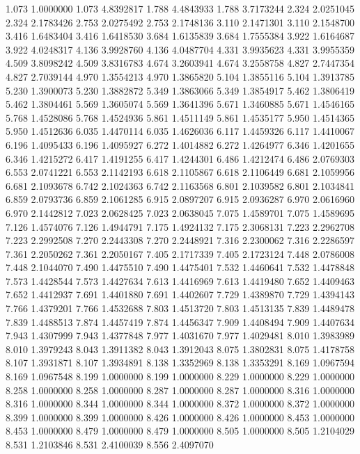 1.073 1.0000000
1.073 4.8392817
1.788 4.4843933
1.788 3.7173244
2.324 2.0251045
2.324 2.1783426
2.753 2.0275492
2.753 2.1748136
3.110 2.1471301
3.110 2.1548700
3.416 1.6483404
3.416 1.6418530
3.684 1.6135839
3.684 1.7555384
3.922 1.6164687
3.922 4.0248317
4.136 3.9928760
4.136 4.0487704
4.331 3.9935623
4.331 3.9955359
4.509 3.8098242
4.509 3.8316783
4.674 3.2603941
4.674 3.2558758
4.827 2.7447354
4.827 2.7039144
4.970 1.3554213
4.970 1.3865820
5.104 1.3855116
5.104 1.3913785
5.230 1.3900073
5.230 1.3882872
5.349 1.3863066
5.349 1.3854917
5.462 1.3806419
5.462 1.3804461
5.569 1.3605074
5.569 1.3641396
5.671 1.3460885
5.671 1.4546165
5.768 1.4528086
5.768 1.4524936
5.861 1.4511149
5.861 1.4535177
5.950 1.4514365
5.950 1.4512636
6.035 1.4470114
6.035 1.4626036
6.117 1.4459326
6.117 1.4410067
6.196 1.4095433
6.196 1.4095927
6.272 1.4014882
6.272 1.4264977
6.346 1.4201655
6.346 1.4215272
6.417 1.4191255
6.417 1.4244301
6.486 1.4212474
6.486 2.0769303
6.553 2.0741221
6.553 2.1142193
6.618 2.1105867
6.618 2.1106449
6.681 2.1059956
6.681 2.1093678
6.742 2.1024363
6.742 2.1163568
6.801 2.1039582
6.801 2.1034841
6.859 2.0793736
6.859 2.1061285
6.915 2.0897207
6.915 2.0936287
6.970 2.0616960
6.970 2.1442812
7.023 2.0628425
7.023 2.0638045
7.075 1.4589701
7.075 1.4589695
7.126 1.4574076
7.126 1.4944791
7.175 1.4924132
7.175 2.3068131
7.223 2.2962708
7.223 2.2992508
7.270 2.2443308
7.270 2.2448921
7.316 2.2300062
7.316 2.2286597
7.361 2.2050262
7.361 2.2050167
7.405 2.1717339
7.405 2.1723124
7.448 2.0786008
7.448 2.1044070
7.490 1.4475510
7.490 1.4475401
7.532 1.4460641
7.532 1.4478848
7.573 1.4428544
7.573 1.4427634
7.613 1.4416969
7.613 1.4419480
7.652 1.4409463
7.652 1.4412937
7.691 1.4401880
7.691 1.4402607
7.729 1.4389870
7.729 1.4394143
7.766 1.4379201
7.766 1.4532688
7.803 1.4513720
7.803 1.4513135
7.839 1.4489478
7.839 1.4488513
7.874 1.4457419
7.874 1.4456347
7.909 1.4408494
7.909 1.4407634
7.943 1.4307999
7.943 1.4377848
7.977 1.4031670
7.977 1.4029481
8.010 1.3983989
8.010 1.3979243
8.043 1.3911382
8.043 1.3912043
8.075 1.3802831
8.075 1.4178758
8.107 1.3931871
8.107 1.3934891
8.138 1.3352969
8.138 1.3353291
8.169 1.0967594
8.169 1.0967548
8.199 1.0000000
8.199 1.0000000
8.229 1.0000000
8.229 1.0000000
8.258 1.0000000
8.258 1.0000000
8.287 1.0000000
8.287 1.0000000
8.316 1.0000000
8.316 1.0000000
8.344 1.0000000
8.344 1.0000000
8.372 1.0000000
8.372 1.0000000
8.399 1.0000000
8.399 1.0000000
8.426 1.0000000
8.426 1.0000000
8.453 1.0000000
8.453 1.0000000
8.479 1.0000000
8.479 1.0000000
8.505 1.0000000
8.505 1.2104029
8.531 1.2103846
8.531 2.4100039
8.556 2.4097070
